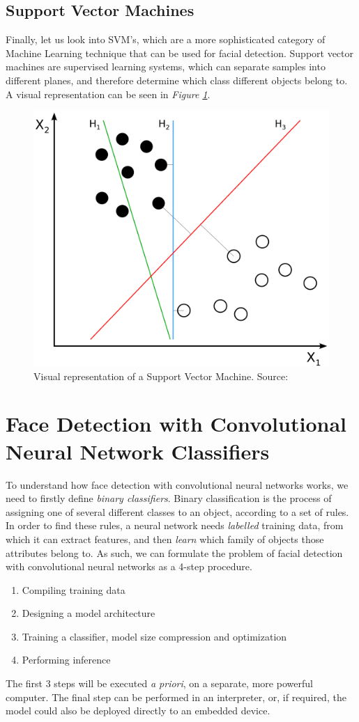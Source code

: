 \subsection{Support Vector Machines}
Finally, let us look into SVM's, which are a more sophisticated category of Machine Learning technique that can be used for facial detection. Support vector machines are supervised learning systems, which can separate samples into different planes, and therefore determine which class different objects belong to. A visual representation can be seen in \textit{Figure \ref{fig:svm}}. \cite{svm}
\begin{figure}
    \centering
    \includegraphics[width = 10 cm]{images/Svm_separating_hyperplanes_(SVG).svg.png}
    \caption{Visual representation of a Support Vector Machine. Source: \cite{svm_pic}}
    \label{fig:svm}
\end{figure}

\section{Face Detection with Convolutional Neural Network Classifiers}
To understand how face detection with convolutional neural networks works, we need to firstly define \textit{binary classifiers}. Binary classification is the process of assigning one of several different classes to an object, according to a set of rules. In order to find these rules, a neural network needs \textit{labelled} training data, from which it can extract features, and then \textit{learn} which family of objects those attributes belong to. As such, we can formulate the problem of facial detection with convolutional neural networks as a 4-step procedure.
\begin{enumerate}
    \item Compiling training data
    \item Designing a model architecture
    \item Training a classifier, model size compression and optimization
    \item Performing inference
\end{enumerate}
The first 3 steps will be executed \textit{a priori}, on a separate, more powerful computer. The final step can be performed in an interpreter, or, if required, the model could also be deployed directly to an embedded device.

